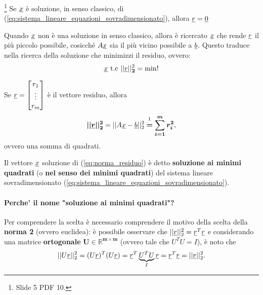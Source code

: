 \begin{remark}\footnote{Slide 5 PDF 10.}
    Se $\uline x$ è soluzione, in senso classico, di (\ref{eq:sistema_lineare_equazioni_sovradimensionato}), allora $\uline r=\uline 0$
\end{remark}

Quando $\uline x$ non è una soluzione in senso classico, allora è ricercato $\uline x$ che rende $\uline r$ il più piccolo possibile, cosicché $A\uline x$ sia il più vicino possibile a $\uline b$. Questo traduce nella ricerca della soluzione  che minimizzi il residuo, ovvero:
\begin{equation}\label{eq:norma_residuo}
    \uline x\text{ t.c }||\uline r||_{\boldsymbol 2}^2=\min!
\end{equation}
\begin{remark}
    Se $\uline r=\begin{bmatrix}
        r_1\\
        \vdots\\
        r_m
    \end{bmatrix}$ è il vettore residuo, allora
    \begin{equation}\label{eq:resNorm2}
        \boldsymbol{||\uline r||_2^2} = ||A\uline x - \uline b||_2^2 \overset{\footnotemark}{\boldsymbol =} \boldsymbol{\sum_{i=1}^m r_i^2},
    \end{equation}
    ovvero una somma di quadrati.
\end{remark}

\begin{definition}\label{def:soluzione_minimi_quadrati}
    Il vettore $\uline x$ soluzione di (\ref{eq:norma_residuo}) è detto \textbf{soluzione ai minimi quadrati} (o \textbf{nel senso dei minimi quadrati}) del sistema lineare sovradimensionato (\ref{eq:sistema_lineare_equazioni_sovradimensionato}). 
\end{definition}

\paragraph{Perche' il nome "soluzione ai minimi quadrati"?} Per comprendere la scelta è necessario comprendere il motivo della scelta della \textbf{norma 2} (ovvero euclidea): è possibile osservare che $||\uline r||_2^2=\uline r^T\uline r$ e considerando una matrice \textbf{ortogonale} $\boldsymbol{U\in\mathbb R^{m\times m}}$ (ovvero tale che $U^TU=I$), è noto che 
\begin{equation*}
    ||U\uline r||_2^2=(U\uline r)^T(U\uline r)=\uline r^T\underbrace{U^TU}_I \uline r = \uline r^T\uline r = ||\uline r||_2^2.
\end{equation*}

